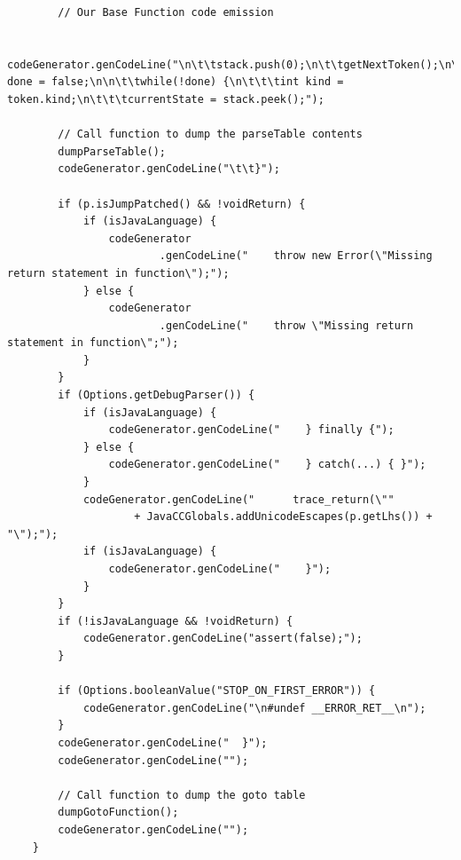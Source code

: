 \documentclass[•]{book}
\begin{document}
\begin{lstlisting}
		// Our Base Function code emission
		
		codeGenerator.genCodeLine("\n\t\tstack.push(0);\n\t\tgetNextToken();\n\t\tboolean done = false;\n\n\t\twhile(!done) {\n\t\t\tint kind = token.kind;\n\t\t\tcurrentState = stack.peek();");
		
		// Call function to dump the parseTable contents
		dumpParseTable();
		codeGenerator.genCodeLine("\t\t}");
		
		if (p.isJumpPatched() && !voidReturn) {
			if (isJavaLanguage) {
				codeGenerator
						.genCodeLine("    throw new Error(\"Missing return statement in function\");");
			} else {
				codeGenerator
						.genCodeLine("    throw \"Missing return statement in function\";");
			}
		}
		if (Options.getDebugParser()) {
			if (isJavaLanguage) {
				codeGenerator.genCodeLine("    } finally {");
			} else {
				codeGenerator.genCodeLine("    } catch(...) { }");
			}
			codeGenerator.genCodeLine("      trace_return(\""
					+ JavaCCGlobals.addUnicodeEscapes(p.getLhs()) + "\");");
			if (isJavaLanguage) {
				codeGenerator.genCodeLine("    }");
			}
		}
		if (!isJavaLanguage && !voidReturn) {
			codeGenerator.genCodeLine("assert(false);");
		}

		if (Options.booleanValue("STOP_ON_FIRST_ERROR")) {
			codeGenerator.genCodeLine("\n#undef __ERROR_RET__\n");
		}
		codeGenerator.genCodeLine("  }");
		codeGenerator.genCodeLine("");

		// Call function to dump the goto table
		dumpGotoFunction();
		codeGenerator.genCodeLine("");
	}
\end{lstlisting}

 
\end{document}
